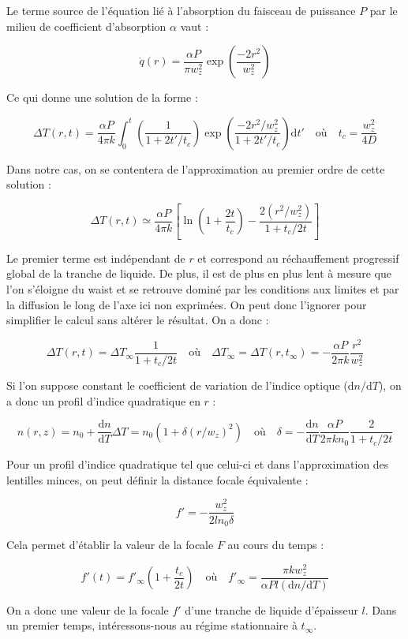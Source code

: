 Le terme source de l'équation lié à l'absorption du faisceau de puissance $P$ par le milieu de coefficient d'absorption $\alpha$ vaut :

$$
\dot{q}(r) = \frac{\alpha P}{\pi w^2_z}\exp \left(\frac{-2r^2}{w^2_z} \right)
$$

Ce qui donne une solution de la forme :

$$
\Delta T(r,t) = \frac{\alpha P}{4\pi k} \int_0^t \left( \frac{1}{1+2t'/t_c} \right) \exp \left( \frac{-2r^2/w_z^2}{1+2t'/t_c} \right) \mathrm{d}t'
\quad \text{où} \quad
t_c = \frac{w_z^2}{4D}
$$

Dans notre cas, on se contentera de l'approximation au premier ordre de cette solution :

$$
\Delta T(r,t) \simeq \frac{\alpha P}{4\pi k} \left[ \ln\left( 1+\frac{2t}{t_c} \right) - \frac{2(r^2/w_z^2)}{1+t_c/2t} \right]
$$

Le premier terme est indépendant de $r$ et correspond au réchauffement progressif global de la tranche de liquide. De plus, il est de plus en plus lent à mesure que l'on s'éloigne du waist et se retrouve dominé par les conditions aux limites et par la diffusion le long de l'axe ici non exprimées. On peut donc l'ignorer pour simplifier le calcul sans altérer le résultat. On a donc :

$$
\Delta T(r,t) = \Delta T_\infty \frac{1}{1+t_c/2t}
\quad \text{où} \quad
\Delta T_\infty = \Delta T(r,t_\infty) = -\frac{\alpha P}{2\pi k}\frac{r^2}{w_z^2}
$$


Si l'on suppose constant le coefficient de variation de l'indice optique ($\mathrm{d}n/\mathrm{d}T$), on a donc un profil d'indice quadratique en $r$ :

$$
n(r,z) = n_0 + \frac{\mathrm{d}n}{\mathrm{d}T}\Delta T = n_0 \left( 1+ \delta (r/w_z)^2 \right)
\quad \text{où} \quad
\delta = - \frac{\mathrm{d}n}{\mathrm{d}T} \frac{\alpha P}{2\pi kn_0} \frac{2}{1+t_c/2t}
$$

Pour un profil d'indice quadratique tel que celui-ci et dans l'approximation des lentilles minces, on peut définir la distance focale équivalente :

$$
f' = -\frac{w^2_z}{2ln_0\delta}
$$

Cela permet d'établir la valeur de la focale $F$ au cours du temps :

$$
f'(t) = f'_\infty \left( 1 + \frac{t_c}{2t} \right) \quad
\text{où} \quad f'_\infty = \frac{\pi k w_z^2}{\alpha Pl(\mathrm{d}n/\mathrm{d}T)}
$$

On a donc une valeur de la focale $f'$ d'une tranche de liquide d'épaisseur $l$. Dans un premier temps, intéressons-nous au régime stationnaire à $t_\infty$.

